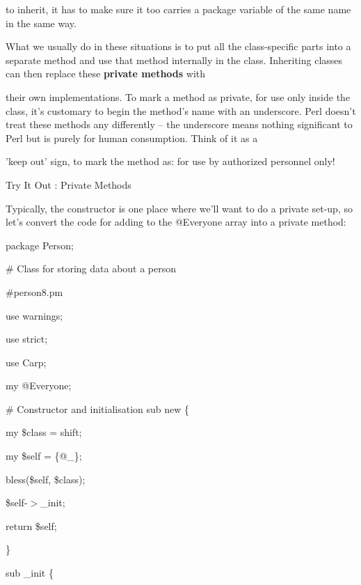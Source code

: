 \documentclass[a4paper,11pt]{book}
\begin{document}
\noindent to inherit, it has to make sure it too carries a package variable of the same name in the same way.

\noindent 

\noindent What we usually do in these situations is to put all the class-specific parts into a separate method and use that method internally in the class. Inheriting classes can then replace these \textbf{private methods }with

\noindent their own implementations. To mark a method as private, for use only inside the class, it's customary to begin the method's name with an underscore. Perl doesn't treat these methods any differently -- the underscore means nothing significant to Perl but is purely for human consumption. Think of it as a

\noindent 'keep out' sign, to mark the method as: for use by authorized personnel only!

\noindent 

\noindent Try It Out : Private Methods

\noindent Typically, the constructor is one place where we'll want to do a private set-up, so let's convert the code for adding to the @Everyone array into a private method:

\noindent 

\noindent package Person;

\noindent \# Class for storing data about a person

\noindent \#person8.pm

\noindent use warnings;

\noindent use strict;

\noindent use Carp;

\noindent 

\noindent my @Everyone;

\noindent 

\noindent \# Constructor and initialisation sub new \{

\noindent my \$class = shift;

\noindent 

\noindent 

\noindent my \$self = \{@\_\};

\noindent bless(\$self, \$class);

\noindent \$self-$>$\_init;

\noindent return \$self;

\noindent \}

\noindent 

\noindent sub \_init \{
\end{document}
